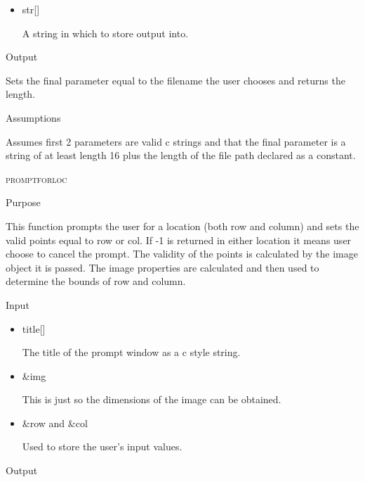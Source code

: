 \documentclass[pdftex, 11pt]{article}
\begin{document}
\begin{description}
\begin{description}
\begin{itemize}
					\item{str[]}

						A string in which to store output into.

				\end{itemize}

			\item{Output}

				Sets the final parameter equal to the filename the user
				chooses and returns the length.

			\item{Assumptions}

				Assumes first 2 parameters are valid c strings and that
				the final parameter is a string of at least length 16 plus
				the length of the file path declared as a constant.

		\end{description}



	\item{\textsc{promptforloc}}
		\begin{description}
			\item{Purpose}

				This function prompts the user for a location (both row and column) and sets
				the valid points equal to row or col.  If -1 is returned in either location
				it means user choose to cancel the prompt.  The validity of the points is
				calculated by the image object it is passed.  The image properties are
				calculated and then used to determine the bounds of row and column.

			\item{Input}

				\begin{itemize}

					\item{title[]}

						The title of the prompt window as a c style string.

					\item{\&img}

						This is just so the dimensions of the image can be obtained.

					\item{\&row and \&col}

						Used to store the user's input values.

				\end{itemize}

			\item{Output}


\end{description}
\end{description}
\end{document}
